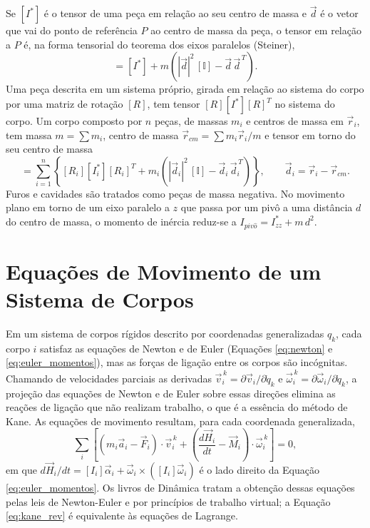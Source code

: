 Se $[I^*]$ é o tensor de uma peça em relação ao seu centro de massa e $\vec d$ é o vetor que vai do ponto de referência $P$ ao centro de massa da peça, o tensor em relação a $P$ é, na forma tensorial do teorema dos eixos paralelos (Steiner),
\begin{equation}
  [I_P] = [I^*] + m\left( |\vec d|^{2}\,[\mathbb{I}] - \vec d\,\vec d^{\,T} \right).
  \label{eq:steiner}
\end{equation}
Uma peça descrita em um sistema próprio, girada em relação ao sistema do corpo por uma matriz de rotação $[R]$, tem tensor $[R][I^*][R]^T$ no sistema do corpo. Um corpo composto por $n$ peças, de massas $m_i$ e centros de massa em $\vec r_i$, tem massa $m=\sum m_i$, centro de massa $\vec r_{cm}=\sum m_i\vec r_i/m$ e tensor em torno do seu centro de massa
\begin{equation}
  [I^*_{cj}] = \sum_{i=1}^{n}\left\{ [R_i][I^*_i][R_i]^T + m_i\left( |\vec d_i|^{2}\,[\mathbb{I}] - \vec d_i\,\vec d_i^{\,T}\right)\right\},
  \qquad \vec d_i=\vec r_i-\vec r_{cm}.
  \label{eq:composicao}
\end{equation}
Furos e cavidades são tratados como peças de massa negativa. No movimento plano em torno de um eixo paralelo a $z$ que passa por um pivô a uma distância $d$ do centro de massa, o momento de inércia reduz-se a $I_{piv\hat{o}}=I^*_{zz}+m\,d^{2}$.

\section{\textbf{Equações de Movimento de um Sistema de Corpos}}
\label{sec:sistemas}

Em um sistema de corpos rígidos descrito por coordenadas generalizadas $q_k$, cada corpo $i$ satisfaz as equações de Newton e de Euler (Equações \ref{eq:newton} e \ref{eq:euler_momentos}), mas as forças de ligação entre os corpos são incógnitas. Chamando de velocidades parciais as derivadas $\vec v_i^{\,k}=\partial\vec v_i/\partial\dot q_k$ e $\vec\omega_i^{\,k}=\partial\vec\omega_i/\partial\dot q_k$, a projeção das equações de Newton e de Euler sobre essas direções elimina as reações de ligação que não realizam trabalho, o que é a essência do método de Kane. As equações de movimento resultam, para cada coordenada generalizada,
\begin{equation}
  \sum_i\left[\left(m_i\vec a_i-\vec F_i\right)\cdot\vec v_i^{\,k}+\left(\frac{d\vec H_i}{dt}-\vec M_i\right)\cdot\vec\omega_i^{\,k}\right]=0 ,
  \label{eq:kane_rev}
\end{equation}
em que $d\vec H_i/dt=[I_i]\vec\alpha_i+\vec\omega_i\times([I_i]\vec\omega_i)$ é o lado direito da Equação \ref{eq:euler_momentos}. Os livros de Dinâmica tratam a obtenção dessas equações pelas leis de Newton-Euler e por princípios de trabalho virtual; a Equação \ref{eq:kane_rev} é equivalente às equações de Lagrange.

